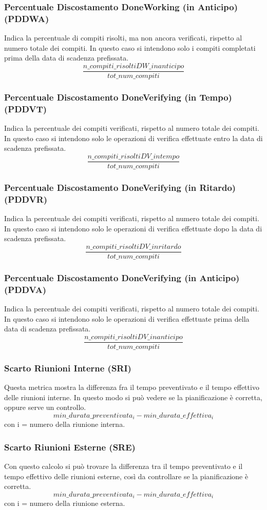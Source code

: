 \subsubsection{Percentuale Discostamento DoneWorking (in Anticipo) (PDDWA)}
Indica la percentuale di compiti risolti, ma non ancora verificati, rispetto al numero totale dei compiti. In questo caso si intendono solo i compiti completati prima della data di scadenza prefissata.
\[\frac{n\_compiti\_risoltiDW\_inanticipo}{tot\_num\_compiti}\]
\subsubsection{Percentuale Discostamento DoneVerifying (in Tempo) (PDDVT)}
Indica la percentuale dei compiti verificati, rispetto al numero totale dei compiti. In questo caso si intendono solo le operazioni di verifica effettuate entro la data di scadenza prefissata.
\[\frac{n\_compiti\_risoltiDV\_intempo}{tot\_num\_compiti}\]

\subsubsection{Percentuale Discostamento DoneVerifying (in Ritardo) (PDDVR)}
Indica la percentuale dei compiti verificati, rispetto al numero totale dei compiti. In questo caso si intendono solo le operazioni di verifica effettuate dopo la data di scadenza prefissata.
\[\frac{n\_compiti\_risoltiDV\_inritardo}{tot\_num\_compiti}\]
\subsubsection{Percentuale Discostamento DoneVerifying (in Anticipo) (PDDVA)}
Indica la percentuale dei compiti verificati, rispetto al numero totale dei compiti. In questo caso si intendono solo le operazioni di verifica effettuate prima della data di scadenza prefissata.
\[\frac{n\_compiti\_risoltiDV\_inanticipo}{tot\_num\_compiti}\]
\subsubsection{Scarto Riunioni Interne (SRI)}
Questa metrica mostra la differenza fra il tempo preventivato e il tempo effettivo delle riunioni interne. In questo modo si può vedere se la pianificazione è corretta, oppure serve un controllo.
\[min\_durata\_preventivata_i-min\_durata\_effettiva_i\] 
con i = numero della riunione interna.
\subsubsection{Scarto Riunioni Esterne (SRE)}
Con questo calcolo si può trovare la differenza tra il tempo preventivato e il tempo effettivo delle riunioni esterne, così da controllare se la pianificazione è corretta.
\[min\_durata\_preventivata_i-min\_durata\_effettiva_i\]
con i = numero della riunione esterna.
